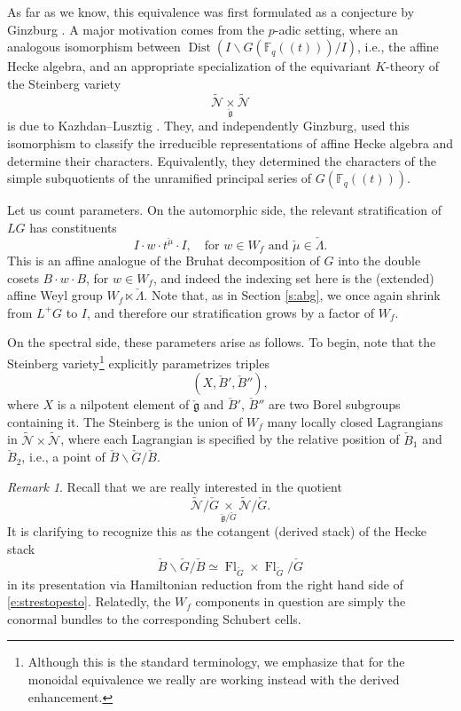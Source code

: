 \documentclass[10pt]{amsart}
\newcommand{\cB}{\check{B}}
\newcommand{\Fqt}{\Fq(\!(t)\!)}
\newcommand{\fg}{\mathfrak{g}}
\newcommand{\on}{\operatorname}
\newcommand{\Fq}{\mathbb{F}_q}
\theoremstyle{remark}
\newtheorem{re}[subsubsection]{Remark}
\newcommand{\sN}{\mathscr{N}}
\newcommand{\Fl}{\operatorname{Fl}}
\numberwithin{equation}{section}
\newcommand{\cfg}{\check{\fg}}
\newcommand{\cG}{\check{G}}
\begin{document}
As far as 
we know, this equivalence was first formulated as a conjecture by Ginzburg \cite{chrissginzburg}. A major 
motivation comes from the $p$-adic 
setting, where an analogous isomorphism between $\on{Dist}(I \backslash G(\Fqt) 
/ 
I)$, i.e., the affine Hecke algebra, and an appropriate specialization of the 
equivariant $K$-theory of the Steinberg variety $$\widetilde{\sN} \underset 
\cfg 
\times \widetilde{\sN}$$is due 
to Kazhdan--Lusztig \cite{kazhdanlusztig87}. They, and independently Ginzburg, used this isomorphism to classify the irreducible representations of affine Hecke algebra and determine their characters. Equivalently, they determined the characters of the simple subquotients of the unramified principal series of $G(\Fqt)$. 

Let us count parameters. On the automorphic side, the relevant stratification 
of $LG$ has constituents 
%
\[
    I\cdot w \cdot t^{\check{\mu}} \cdot I, \quad \text{for } w \in W_f \text{ 
    and } 
    \check{\mu} \in \check{\Lambda}.  
\]
%
This is an affine analogue of the Bruhat decomposition of $G$ into the double cosets $B \cdot w \cdot B$, for 
$w \in W_f$, and indeed the indexing set here is the (extended) affine Weyl 
group $W_f \ltimes \check{\Lambda}.$ Note that, as in Section \ref{s:abg}, we once again shrink from $L^+G$ 
to $I$, and therefore our stratification grows by a factor of $W_f$. 

On the spectral side, these parameters arise as follows. To begin, note that 
 the Steinberg variety\footnote{Although this is the standard 
terminology, we emphasize that for the monoidal equivalence we really are 
working instead with the derived enhancement.} explicitly parametrizes triples $$(X, \cB', 
\cB''),$$where $X$ is a nilpotent element of $\cfg$ 
and $\cB'$, $\cB''$ are two Borel subgroups containing it. The Steinberg is the union of 
$W_f$ many locally closed Lagrangians in $\widetilde{\sN} \times \widetilde{\sN}$, where each 
Lagrangian is 
specified by the relative position of $\cB_1$ and $\cB_2$, i.e., a point of $\cB 
\backslash \cG / \cB$. 

\begin{re}  Recall that we are really interested in the quotient $$\widetilde{\sN} / 
\cG \underset {\cfg/\cG} 
\times \widetilde{\sN} / \cG.$$It is clarifying to recognize this as the 
cotangent (derived stack) of 
the 
Hecke stack
\begin{equation} \label{e:strestopesto} \cB \backslash \cG / \cB \simeq \Fl_{\cG} \times \Fl_{\cG} / \cG
\end{equation}
in its presentation via Hamiltonian reduction from the right hand side of \eqref{e:strestopesto}. 
Relatedly, the $W_f$ components in question are simply the conormal bundles to 
the 
corresponding Schubert cells. 
\end{re} 
\end{document}
